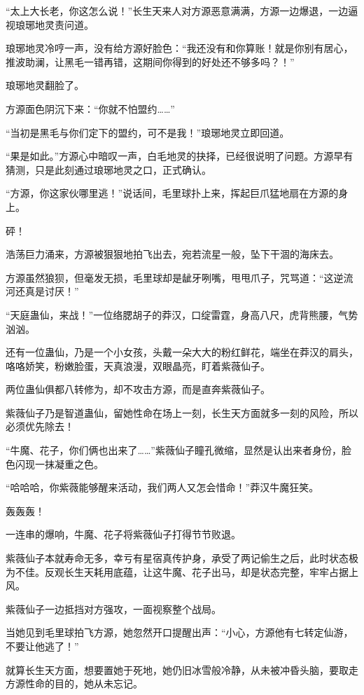 
\begin{this_body}

“太上大长老，你这怎么说！”长生天来人对方源恶意满满，方源一边爆退，一边逼视琅琊地灵责问道。

琅琊地灵冷哼一声，没有给方源好脸色：“我还没有和你算账！就是你别有居心，推波助澜，让黑毛一错再错，这期间你得到的好处还不够多吗？！”

琅琊地灵翻脸了。

方源面色阴沉下来：“你就不怕盟约……”

“当初是黑毛与你们定下的盟约，可不是我！”琅琊地灵立即回道。

“果是如此。”方源心中暗叹一声，白毛地灵的抉择，已经很说明了问题。方源早有猜测，只是此刻通过琅琊地灵之口，正式确认。

“方源，你这家伙哪里逃！”说话间，毛里球扑上来，挥起巨爪猛地扇在方源的身上。

砰！

浩荡巨力涌来，方源被狠狠地拍飞出去，宛若流星一般，坠下干涸的海床去。

方源虽然狼狈，但毫发无损，毛里球却是龇牙咧嘴，甩甩爪子，咒骂道：“这逆流河还真是讨厌！”

“天庭蛊仙，来战！”一位络腮胡子的莽汉，口绽雷霆，身高八尺，虎背熊腰，气势汹汹。

还有一位蛊仙，乃是一个小女孩，头戴一朵大大的粉红鲜花，端坐在莽汉的肩头，咯咯娇笑，粉嫩脸蛋，天真浪漫，双眼晶亮，盯着紫薇仙子。

两位蛊仙俱都八转修为，却不攻击方源，而是直奔紫薇仙子。

紫薇仙子乃是智道蛊仙，留她性命在场上一刻，长生天方面就多一刻的风险，所以必须优先除去！

“牛魔、花子，你们俩也出来了……”紫薇仙子瞳孔微缩，显然是认出来者身份，脸色闪现一抹凝重之色。

“哈哈哈，你紫薇能够醒来活动，我们两人又怎会惜命！”莽汉牛魔狂笑。

轰轰轰！

一连串的爆响，牛魔、花子将紫薇仙子打得节节败退。

紫薇仙子本就寿命无多，幸亏有星宿真传护身，承受了两记偷生之后，此时状态极为不佳。反观长生天耗用底蕴，让这牛魔、花子出马，却是状态完整，牢牢占据上风。

紫薇仙子一边抵挡对方强攻，一面视察整个战局。

当她见到毛里球拍飞方源，她忽然开口提醒出声：“小心，方源他有七转定仙游，不要让他逃了！”

就算长生天方面，想要置她于死地，她仍旧冰雪般冷静，从未被冲昏头脑，要取走方源性命的目的，她从未忘记。


\end{this_body}
